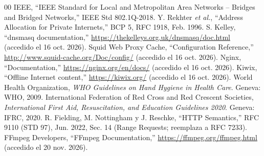 \documentclass[conference]{IEEEtran}
\begin{document}
\begin{thebibliography}{00}
 IEEE, ``IEEE Standard for Local and Metropolitan Area Networks -- Bridges and Bridged Networks,'' IEEE Std 802.1Q-2018.
 Y. Rekhter \textit{et al.}, ``Address Allocation for Private Internets,'' BCP 5, RFC 1918, Feb. 1996.
 S. Kelley, ``dnsmasq documentation,'' \url{https://thekelleys.org.uk/dnsmasq/doc.html} (accedido el 16 oct. 2026).
 Squid Web Proxy Cache, ``Configuration Reference,'' \url{http://www.squid-cache.org/Doc/config/} (accedido el 16 oct. 2026).
 Nginx, ``Documentation,'' \url{https://nginx.org/en/docs/} (accedido el 16 oct. 2026).
 Kiwix, ``Offline Internet content,'' \url{https://kiwix.org/} (accedido el 16 oct. 2026).
 World Health Organization, \textit{WHO Guidelines on Hand Hygiene in Health Care}. Geneva: WHO, 2009.
 International Federation of Red Cross and Red Crescent Societies, \textit{International First Aid, Resuscitation, and Education Guidelines 2020}. Geneva: IFRC, 2020.
 R. Fielding, M. Nottingham y J. Reschke, ``HTTP Semantics,'' RFC 9110 (STD 97), Jun. 2022, Sec. 14 (Range Requests; reemplaza a RFC 7233).
 FFmpeg Developers, ``FFmpeg Documentation,'' \url{https://ffmpeg.org/ffmpeg.html} (accedido el 20 nov. 2026).
\end{thebibliography}
\end{document}
